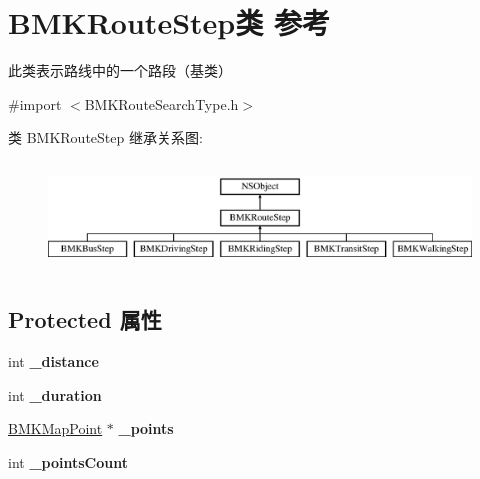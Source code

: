 \hypertarget{interface_b_m_k_route_step}{}\section{B\+M\+K\+Route\+Step类 参考}
\label{interface_b_m_k_route_step}


此类表示路线中的一个路段（基类）  




{\ttfamily \#import $<$B\+M\+K\+Route\+Search\+Type.\+h$>$}

类 B\+M\+K\+Route\+Step 继承关系图\+:\begin{figure}[H]
\begin{center}
\leavevmode
\includegraphics[height=2.896552cm]{interface_b_m_k_route_step}
\end{center}
\end{figure}
\subsection*{Protected 属性}
\begin{DoxyCompactItemize}
\item 
\hypertarget{interface_b_m_k_route_step_ad3cde05d4399b85ec3acd42a7c423c1a}{}int {\bfseries \+\_\+distance}\label{interface_b_m_k_route_step_ad3cde05d4399b85ec3acd42a7c423c1a}

\item 
\hypertarget{interface_b_m_k_route_step_aa51f65db494e87099473478e04bc3e2c}{}int {\bfseries \+\_\+duration}\label{interface_b_m_k_route_step_aa51f65db494e87099473478e04bc3e2c}

\item 
\hypertarget{interface_b_m_k_route_step_a8aa8cc9d1b1c845ecb418fb8ab97f12c}{}\hyperlink{struct_b_m_k_map_point}{B\+M\+K\+Map\+Point} $\ast$ {\bfseries \+\_\+points}\label{interface_b_m_k_route_step_a8aa8cc9d1b1c845ecb418fb8ab97f12c}

\item 
\hypertarget{interface_b_m_k_route_step_aa66e782ce3d4a34af627113e2e41aea1}{}int {\bfseries \+\_\+points\+Count}\label{interface_b_m_k_route_step_aa66e782ce3d4a34af627113e2e41aea1}

\end{DoxyCompactItemize}

